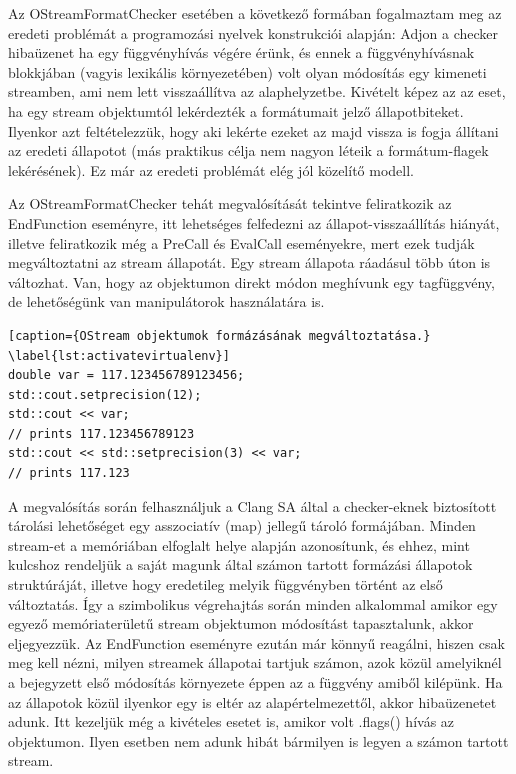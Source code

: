 \documentclass[a4paper,12pt]{report}
\begin{document}
Az OStreamFormatChecker esetében a következő formában fogalmaztam meg az eredeti problémát a programozási nyelvek konstrukciói alapján: Adjon a checker hibaüzenet ha egy függvényhívás végére érünk, és ennek a függvényhívásnak blokkjában (vagyis lexikális környezetében) volt olyan módosítás egy kimeneti streamben, ami nem lett visszaállítva az alaphelyzetbe. Kivételt képez az az eset, ha egy stream objektumtól lekérdezték a formátumait jelző állapotbiteket. Ilyenkor azt feltételezzük, hogy aki lekérte ezeket az majd vissza is fogja állítani az eredeti állapotot (más praktikus célja nem nagyon léteik a formátum-flagek lekérésének). Ez már az eredeti problémát elég jól közelítő modell.

Az OStreamFormatChecker tehát megvalósítását tekintve feliratkozik az EndFunction eseményre, itt lehetséges felfedezni az állapot-visszaállítás hiányát, illetve feliratkozik még a PreCall és EvalCall eseményekre, mert ezek tudják megváltoztatni az stream állapotát. Egy stream állapota ráadásul több úton is változhat. Van, hogy az objektumon direkt módon meghívunk egy tagfüggvény, de lehetőségünk van manipulátorok használatára is.

\begin{lstlisting}[caption={OStream objektumok formázásának megváltoztatása.}
\label{lst:activatevirtualenv}]
double var = 117.123456789123456;
std::cout.setprecision(12);
std::cout << var;
// prints 117.123456789123
std::cout << std::setprecision(3) << var;
// prints 117.123
\end{lstlisting}

A megvalósítás során felhasználjuk a Clang SA által a checker-eknek biztosított tárolási lehetőséget egy asszociatív (map) jellegű tároló formájában. Minden stream-et a memóriában elfoglalt helye alapján azonosítunk, és ehhez, mint kulcshoz rendeljük a saját magunk által számon tartott formázási állapotok struktúráját, illetve hogy eredetileg melyik függvényben történt az első változtatás. Így a szimbolikus végrehajtás során minden alkalommal amikor egy egyező memóriaterületű stream objektumon módosítást tapasztalunk, akkor eljegyezzük. Az EndFunction eseményre ezután már könnyű reagálni, hiszen csak meg kell nézni, milyen streamek állapotai tartjuk számon, azok közül amelyiknél a bejegyzett első módosítás környezete éppen az a függvény amiből kilépünk. Ha az állapotok közül ilyenkor egy is eltér az alapértelmezettől, akkor hibaüzenetet adunk. Itt kezeljük még a kivételes esetet is, amikor volt .flags() hívás az objektumon. Ilyen esetben nem adunk hibát bármilyen is legyen a számon tartott stream.
\end{document}
